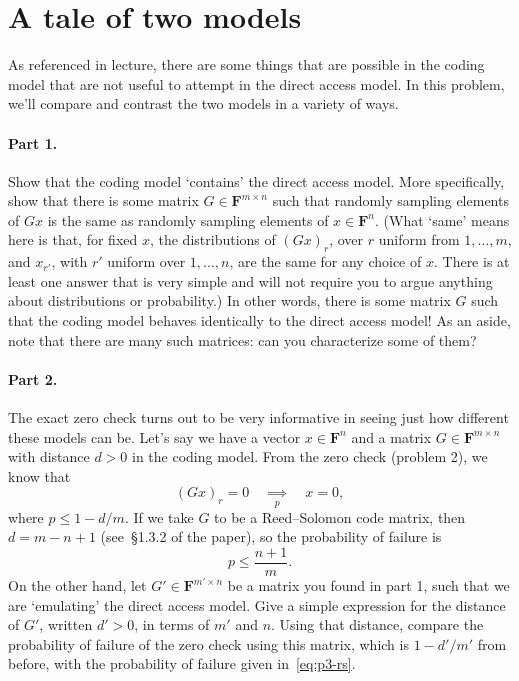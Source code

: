 \documentclass[12pt]{article}
\newcommand{\field}{\mathbf{F}}
\newcommand{\impliesn}[1]{\underset{#1}{\implies}}
\newcommand{\impliesp}{\impliesn{p}}
\begin{document}
\section{A tale of two models}
As referenced in lecture, there are some things that are possible in the coding
model that are not useful to attempt in the direct access model. In this problem,
we'll compare and contrast the two models in a variety of ways.

\paragraph{Part 1.} Show that the coding model `contains' the direct access
model. More specifically, show that there is some matrix $G \in \field^{m
\times n}$ such that randomly sampling elements of $Gx$ is the same as randomly
sampling elements of $x \in \field^n$. (What `same' means here is that, for
fixed $x$, the distributions of $(Gx)_r$, over $r$ uniform from $1, \dots, m$,
and $x_{r'}$, with $r'$ uniform over $1, \dots, n$, are the same for any choice
of $x$. There is at least one answer that is very simple and will not require
you to argue anything about distributions or probability.) In other words,
there is some matrix $G$ such that the coding model behaves identically to the
direct access model! As an aside, note that there are many such matrices: can
you characterize some of them?

\paragraph{Part 2.} The exact zero check turns out to be very informative in
seeing just how different these models can be. Let's say we have a vector $x
\in \field^n$ and a matrix $G \in \field^{m \times n}$ with distance $d > 0$ in
the coding model. From the zero check (problem 2), we know that
\[
    (Gx)_r = 0 \quad \impliesp \quad x = 0,
\]
where $p \le 1-d/m$. If we take $G$ to be a Reed--Solomon code matrix, then $d
= m-n+1$ (see~\S1.3.2 of the paper), so the probability of failure is
\begin{equation}\label{eq:p3-rs}
    p \le \frac{n+1}{m}.
\end{equation}
On the other hand, let $G' \in \field^{m' \times n}$ be a matrix you found in
part 1, such that we are `emulating' the direct access model. Give a simple
expression for the distance of $G'$, written $d' > 0$, in terms of $m'$ and
$n$. Using that distance, compare the probability of failure of the zero check
using this matrix, which is $1-d'/m'$ from before, with the probability of
failure given in~\eqref{eq:p3-rs}.
\end{document}
